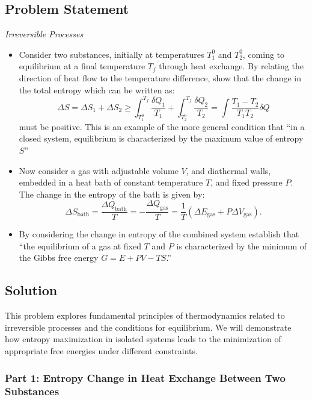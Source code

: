 \documentclass[10pt,twocoloumn]{article}
\begin{document}
\subsection*{Problem Statement}
\textit{Irreversible Processes}
\begin{itemize}
    \item Consider two substances, initially at temperatures $T^0_1$ and $T^0_2$, coming to equilibrium at a final temperature $T_f$ through heat exchange. By relating the direction of heat flow to the temperature difference, show that the change in the total entropy which can be written as:
    \begin{equation}
        \Delta S = \Delta S_1 + \Delta S_2 \geq \int_{T_1^0}^{T_f} \frac{\delta Q_1}{T_1} + \int_{T_2^0}^{T_f}\frac{\delta Q_2}{T_2} = \int \frac{T_1 - T_2}{T_1T_2}\delta Q
    \end{equation}
    must be positive. This is an example of the more general condition that ``in a closed system, equilibrium is characterized by the maximum value of entropy $S$''
    \item Now consider a gas with adjustable volume $V$, and diathermal walls, embedded in a heat bath of constant temperature $T$, and fixed pressure $P$. The change in the entropy of the bath is given by:
    \begin{equation}
        \Delta S_{\text{bath}} = \frac{\Delta Q_{\text{bath}}}{T} = -\frac{\Delta Q_{\text{gas}}}{T} = \frac{1}{T}\left(\Delta E_{\text{gas}} + P \Delta V_{\text{gas}}\right).
    \end{equation}
    \item By considering the change in entropy of the combined system establish that ``the equilibrium of a gas at fixed $T$ and $P$ is characterized by the minimum of the Gibbs free energy $G= E + PV - TS$.''
\end{itemize}

\subsection*{Solution}

This problem explores fundamental principles of thermodynamics related to irreversible processes and the conditions for equilibrium. We will demonstrate how entropy maximization in isolated systems leads to the minimization of appropriate free energies under different constraints.

\subsubsection*{Part 1: Entropy Change in Heat Exchange Between Two Substances}
\end{document}
